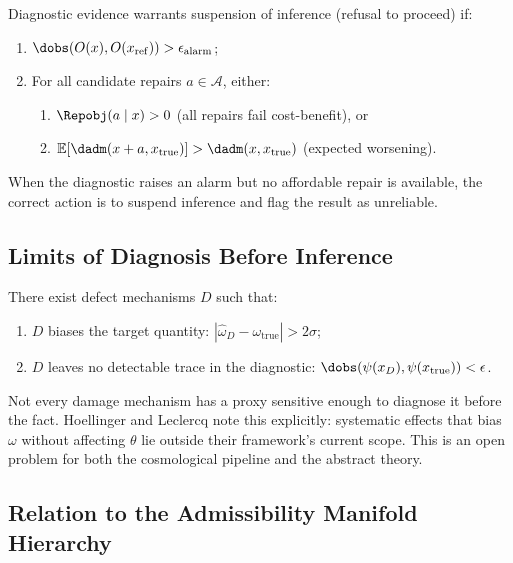 \begin{theorem}
Diagnostic evidence warrants suspension of inference (refusal to proceed) if:
\begin{enumerate}
\item $\dobs(O(x), O(x_{\mathrm{ref}})) > \epsilon_{\mathrm{alarm}}$;
\item For all candidate repairs $a \in \mathcal{A}$, either:
   \begin{enumerate}
   \item $\Repobj(a \mid x) > 0$ (all repairs fail cost-benefit), or
   \item $\mathbb{E}[\dadm(x + a, x_{\mathrm{true}})] > \dadm(x, x_{\mathrm{true}})$ (expected worsening).
   \end{enumerate}
\end{enumerate}
\end{theorem}

When the diagnostic raises an alarm but no affordable repair is available, the correct action is to suspend inference and flag the result as unreliable.


\subsection{Limits of Diagnosis Before Inference}

\begin{proposition}
There exist defect mechanisms $D$ such that:
\begin{enumerate}
\item $D$ biases the target quantity: $|\hat\omega_D - \omega_{\mathrm{true}}| > 2\sigma$;
\item $D$ leaves no detectable trace in the diagnostic: $\dobs(\psi(x_D), \psi(x_{\mathrm{true}})) < \epsilon$.
\end{enumerate}
\end{proposition}

Not every damage mechanism has a proxy sensitive enough to diagnose it before the fact. Hoellinger and Leclercq note this explicitly: systematic effects that bias $\omega$ without affecting $\theta$ lie outside their framework's current scope. This is an open problem for both the cosmological pipeline and the abstract theory.


\subsection{Relation to the Admissibility Manifold Hierarchy}

